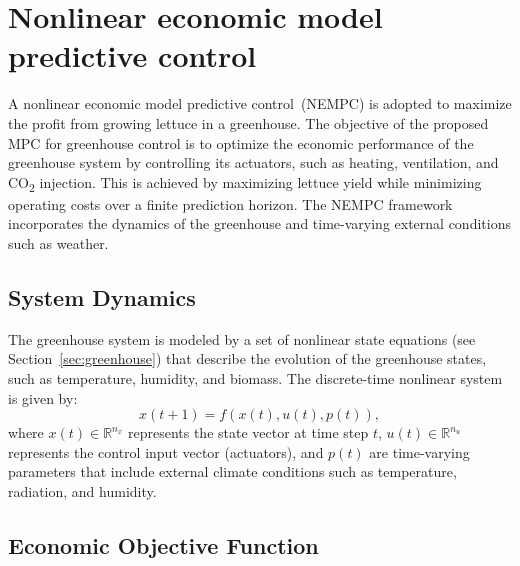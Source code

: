 \documentclass[conference]{IEEEtran}
\newcommand{\ui}[2]{#1_{\mathrm{#2}}}
\begin{document}




\section{Nonlinear economic model predictive control}\label{sec:mpc}

A nonlinear economic model predictive control~(NEMPC) is adopted to maximize the profit from growing lettuce in a greenhouse. The objective of the proposed MPC for greenhouse control is to optimize the economic performance of the greenhouse system by controlling its actuators, such as heating, ventilation, and CO\textsubscript{2} injection. This is achieved by maximizing lettuce yield while minimizing operating costs over a finite prediction horizon. The NEMPC framework incorporates the dynamics of the greenhouse and time-varying external conditions such as weather.

\subsection{System Dynamics}\label{subsec:mpc_dynamics}

The greenhouse system is modeled by a set of nonlinear state equations (see Section~\ref{sec:greenhouse}) that describe the evolution of the greenhouse states, such as temperature, humidity, and biomass. The discrete-time nonlinear system is given by:
\begin{equation}
    x(t+1) = f\left( x(t), u(t), p(t) \right),
\end{equation}
where \(x(t) \in \mathbb{R}^{n_x}\) represents the state vector at time step \(t\), \(u(t) \in \mathbb{R}^{n_u}\) represents the control input vector (actuators), and \(p(t)\) are time-varying parameters that include external climate conditions such as temperature, radiation, and humidity.

\subsection{Economic Objective Function}\label{subsec:mpc_objective}
\end{document}
